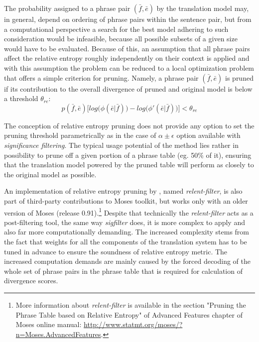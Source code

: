 The probability assigned to a phrase pair $(\bar{f},\bar{e})$ by the translation model
may, in general, depend on ordering of phrase pairs within the sentence pair, but from
a computational perspective a search for the best model adhering to such consideration
would be infeasible, because all possible subsets of a given size would have to be evaluated.
Because of this, an assumption that all phrase pairs affect the relative entropy roughly
independently on their context is applied and with this assumption the problem can be
reduced to a local optimization problem that offers a simple criterion for pruning.
Namely, a phrase pair $(\bar{f},\bar{e})$ is pruned if its contribution to the overall
divergence of pruned and original model is below a threshold $\theta_{re}$:
\begin{equation}
  p(\bar{f},\bar{e}) \Big[log\big(\phi(\bar{e}|\bar{f})\big) - log\big(\phi'(\bar{e}|\bar{f})\big)\Big] < \theta_{re}
\end{equation}

The conception of relative entropy pruning does not provide any option to set
the pruning threshold parametrically as in the case of $\alpha \pm \epsilon$ option
available with \emph{significance filtering}.
The typical usage potential of the method lies rather in possibility to prune off
a given portion of a phrase table (eg. 50\% of it), ensuring that the translation model
powered by the pruned table will perform as closely to the original model as possible.

An implementation of relative entropy pruning by \citet{ling:relentfilter}, named
\emph{relent-filter}, is also part of third-party contributions to Moses toolkit,
but works only with an older version of Moses (release 0.91).\footnote{More information
about \emph{relent-filter} is available in the section "Pruning the Phrase Table based
on Relative Entropy" of Advanced Features chapter of Moses online manual:
\url{http://www.statmt.org/moses/?n=Moses.AdvancedFeatures}.}
Despite that technically the \emph{relent-filter} acts as a post-filtering tool,
the same way \emph{sigfilter} does, it is more complex to apply and also far more
computationally demanding.
The increased complexity stems from the fact that weights for all the components of the
translation system has to be tuned in advance to ensure the soundness of relative entropy metric.
The increased computation demands are mainly caused by the forced decoding of the whole set of
phrase pairs in the phrase table that is required for calculation of divergence scores.

